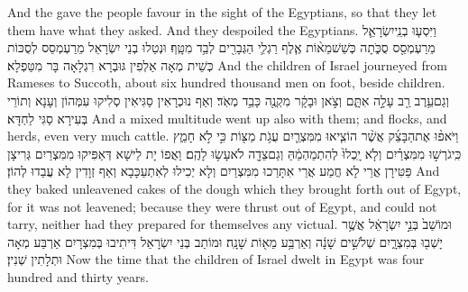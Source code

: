 {And the \lord\space gave the people favour in the sight of the Egyptians, so that they let them have what they asked. And they despoiled the Egyptians.}{}
{וַיִּסְע֧וּ בְנֵֽי\maqqaf יִשְׂרָאֵ֛ל מֵרַעְמְסֵ֖ס סֻכֹּ֑תָה כְּשֵׁשׁ\maqqaf מֵא֨וֹת אֶ֧לֶף רַגְלִ֛י הַגְּבָרִ֖ים לְבַ֥ד מִטָּֽף׃}
{וּנְטַלוּ בְנֵי יִשְׂרָאֵל מֵרַעְמְסֵס לְסֻכּוֹת כְּשֵׁית מְאָה אַלְפִין גּוּבְרָא רִגְלָאָה בָּר מִטַּפְלָא׃}
{And the children of Israel journeyed from Rameses to Succoth, about six hundred thousand men on foot, beside children.}{}
{וְגַם\maqqaf עֵ֥רֶב רַ֖ב עָלָ֣ה אִתָּ֑ם וְצֹ֣אן וּבָקָ֔ר מִקְנֶ֖ה כָּבֵ֥ד מְאֹֽד׃}
{וְאַף נוּכְרָאִין סַגִּיאִין סְלִיקוּ עִמְּהוֹן וְעָנָא וְתוֹרֵי בְּעִירָא סַגִּי לַחְדָּא׃}
{And a mixed multitude went up also with them; and flocks, and herds, even very much cattle.}{}
{וַיֹּאפ֨וּ אֶת\maqqaf הַבָּצֵ֜ק אֲשֶׁ֨ר הוֹצִ֧יאוּ מִמִּצְרַ֛יִם עֻגֹ֥ת מַצּ֖וֹת כִּ֣י לֹ֣א חָמֵ֑ץ כִּֽי\maqqaf גֹרְשׁ֣וּ מִמִּצְרַ֗יִם וְלֹ֤א יָֽכְלוּ֙ לְהִתְמַהְמֵ֔הַּ וְגַם\maqqaf צֵדָ֖ה לֹא\maqqaf עָשׂ֥וּ לָהֶֽם׃}
{וַאֲפוֹ יָת לֵישָׁא דְּאַפִּיקוּ מִמִּצְרַיִם גְּרִיצָן פַּטִּירָן אֲרֵי לָא חֲמַע אֲרֵי אִתָּרַכוּ מִמִּצְרַיִם וְלָא יְכִילוּ לְאִתְעַכָּבָא וְאַף זְוָדִין לָא עֲבַדוּ לְהוֹן׃}
{And they baked unleavened cakes of the dough which they brought forth out of Egypt, for it was not leavened; because they were thrust out of Egypt, and could not tarry, neither had they prepared for themselves any victual.}{}
{וּמוֹשַׁב֙ בְּנֵ֣י יִשְׂרָאֵ֔ל אֲשֶׁ֥ר יָשְׁב֖וּ בְּמִצְרָ֑יִם שְׁלֹשִׁ֣ים שָׁנָ֔ה וְאַרְבַּ֥ע מֵא֖וֹת שָׁנָֽה׃}
{וּמוֹתַב בְּנֵי יִשְׂרָאֵל דִּיתִיבוּ בְּמִצְרָיִם אַרְבַּע מְאָה וּתְלָתִין שְׁנִין׃}
{Now the time that the children of Israel dwelt in Egypt was four hundred and thirty years.}{}
